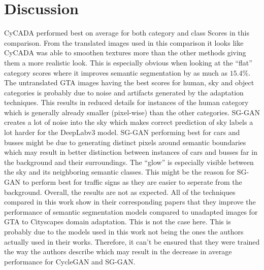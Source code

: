 \newpage

\section{Discussion}
CyCADA performed best on average for both category and class Scores in this comparison. From the translated images used in this comparison it looks like CyCADA was able to smoothen textures more than the other methods giving them a more realistic look. This is especially obvious when looking at the ``flat'' category scores where it improves semantic segmentation by as much as $15.4\%$. The untranslated GTA images having the best scores for human, sky and object categories is probably due to noise and artifacts generated by the adaptation techniques. This results in reduced details for instances of the human category which is generally already smaller (pixel-wise) than the other categories. SG-GAN creates a lot of noise into the sky which makes correct prediction of sky labels a lot harder for the DeepLabv3 model. SG-GAN performing best for cars and busses might be due to generating distinct pixels around semantic boundaries which may result in better distinction between instances of cars and busses far in the background and their surroundings. The ``glow'' is especially visible between the sky and its neighboring semantic classes. This might be the reason for SG-GAN to perform best for traffic signs as they are easier to seperate from the background. Overall, the results are not as expected. All of the techniques compared in this work show in their corresponding papers that they improve the performance of semantic segmentation models compared to unadapted images for GTA to Cityscapes domain adaptation. This is not the case here. This is probably due to the models used in this work not being the ones the authors actually used in their works. Therefore, it can't be ensured that they were trained the way the authors describe which may result in the decrease in average performance for CycleGAN and SG-GAN. 
